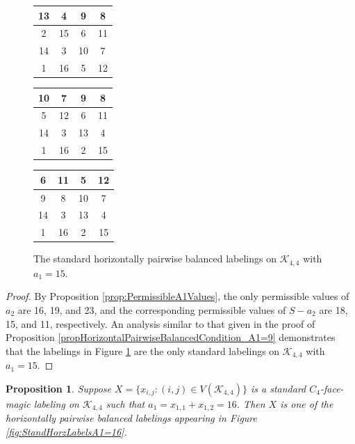 \documentclass[10pt, reqno]{amsart}
\theoremstyle{definition}
\theoremstyle{plain}
\newtheorem{proposition}[definition]{Proposition}
\begin{document}
\begin{figure}[hbt!]
    \centering
    \begin{tabular}{|c|c|c|c|} \hline
        13 &4   &9   &8   \\  \hline
        2  &15   &6   &11  \\  \hline
        14 &3   &10  &7   \\  \hline
        1  &16  &5   &12  \\  \hline
    \end{tabular}
\hspace{0.15in}\begin{tabular}{|c|c|c|c|} \hline
        10 &7   &9   &8   \\  \hline
        5  &12   &6   &11  \\  \hline
        14 &3   &13  &4   \\  \hline
        1  &16  &2   &15  \\  \hline
    \end{tabular}
 \hspace{0.15in}   \begin{tabular}{|c|c|c|c|} \hline
        6  &11  &5  &12  \\  \hline
        9  &8    &10  &7  \\  \hline
        14 &3   &13  &4  \\  \hline
        1  &16  &2   &15  \\  \hline
    \end{tabular}
    \caption{The standard horizontally pairwise balanced labelings on
    $\mathcal{K}_{4,4}$ with $a_1=15$.}
    \label{fig:StandHorzLabelsA1=15}
\end{figure}

\begin{proof}
    By Proposition \ref{prop:PermissibleA1Values}, the only
    permissible values of $a_2$ are 16, 19, and 23,
    and the corresponding permissible values of $S-a_2$
    are 18, 15, and 11, respectively.
    An analysis similar to that given in the proof of
    Proposition \ref{propHorizontalPairwiseBalancedCondition_A1=9}
    demonstrates that the labelings in Figure \ref{fig:StandHorzLabelsA1=15} are the only standard
    labelings on $\mathcal{K}_{4,4}$ with $a_1=15$.
\end{proof}


\begin{proposition} 
\label{propHorizontalPairwiseBalancedCondition_A1=1}
  Suppose $X=\{ x_{i,j} : (i,j) \in V(\mathcal{K}_{4,4})\}$ 
  is a standard $C_4$-face-magic labeling on $\mathcal{K}_{4,4}$ 
  such that $a_1=x_{1,1}+x_{1,2}=16$.
  Then $X$ is one of the 
  horizontally pairwise balanced labelings appearing in
  Figure \ref{fig:StandHorzLabelsA1=16}. 
\end{proposition}
\end{document}
